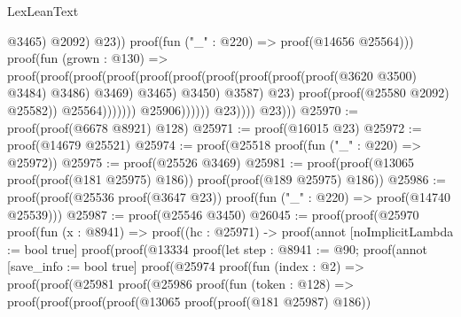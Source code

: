 \begin{lexlean}{LexLeanText}
\begin{coremodule}
                                                                    @3465)
                                                                  @2092)
                                                                @23))
                                                          proof(fun ("_" : @220) =>
                                                            proof(@14656 @25564)))
                                                        proof(fun (grown : @130) =>
                                                          proof(proof(proof(proof(proof(proof(proof(proof(proof(proof(@3620
                                                                                @3500)
                                                                              @3484)
                                                                            @3486)
                                                                          @3469)
                                                                        @3465)
                                                                      @3450)
                                                                    @3587)
                                                                  @23)
                                                                proof(proof(@25580 @2092) @25582))
                                                              @25564)))))))
                                        @25906))))))
                        @23))))
              @23)))
@25970 := proof(proof(@6678 @8921) @128)
@25971 := proof(@16015 @23)
@25972 := proof(@14679 @25521)
@25974 := proof(@25518 proof(fun ("_" : @220) => @25972))
@25975 := proof(@25526 @3469)
@25981 := proof(proof(@13065 proof(proof(@181 @25975) @186)) proof(proof(@189 @25975) @186))
@25986 := proof(proof(@25536 proof(@3647 @23)) proof(fun ("_" : @220) => proof(@14740 @25539)))
@25987 := proof(@25546 @3450)
@26045 := proof(proof(@25970
        proof(fun (x : @8941) =>
          proof((hc : @25971) ->
            proof(annot [noImplicitLambda := bool true]
              proof(proof(@13334
                    proof(let step : @8941 := @90;
                      proof(annot [save_info := bool true]
                        proof(@25974
                            proof(fun (index : @2) =>
                              proof(proof(@25981
                                    proof(@25986
                                        proof(fun (token : @128) =>
                                          proof(proof(proof(proof(@13065
                                                    proof(proof(@181 @25987) @186))

\end{coremodule}
\end{lexlean}
